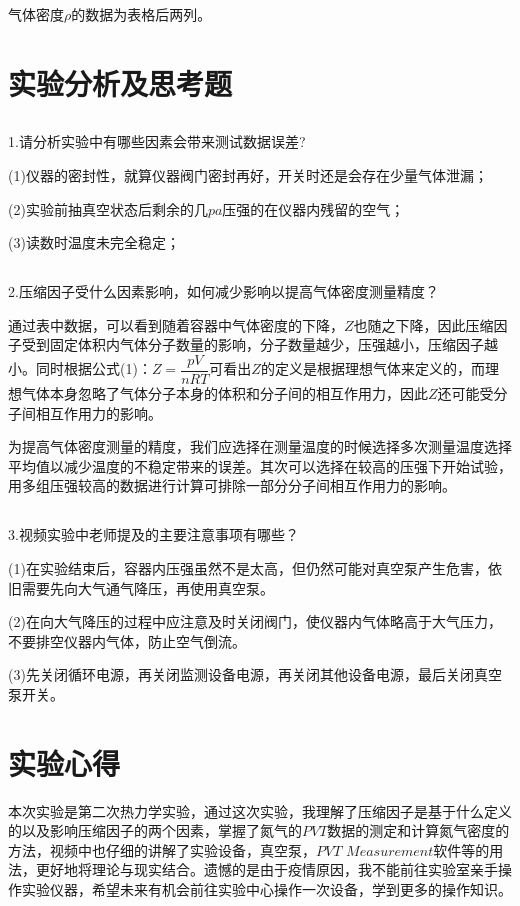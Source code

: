 \documentclass[UTF8,a4paper,10pt]{ctexart}
\begin{document}
    气体密度$\rho$的数据为表格后两列。
	\section{实验分析及思考题}
	\subsection{}
	1.请分析实验中有哪些因素会带来测试数据误差?
	
	(1)仪器的密封性，就算仪器阀门密封再好，开关时还是会存在少量气体泄漏；
	
	(2)实验前抽真空状态后剩余的几$pa$压强的在仪器内残留的空气；
	
	(3)读数时温度未完全稳定；
	\subsection{}
	2.压缩因子受什么因素影响，如何减少影响以提高气体密度测量精度？
	
	通过表中数据，可以看到随着容器中气体密度的下降，$Z$也随之下降，因此压缩因子受到固定体积内气体分子数量的影响，分子数量越少，压强越小，压缩因子越小。同时根据公式(1)：$Z=\dfrac{pV}{nRT}$可看出$Z$的定义是根据理想气体来定义的，而理想气体本身忽略了气体分子本身的体积和分子间的相互作用力，因此$Z$还可能受分子间相互作用力的影响。
	
	为提高气体密度测量的精度，我们应选择在测量温度的时候选择多次测量温度选择平均值以减少温度的不稳定带来的误差。其次可以选择在较高的压强下开始试验，用多组压强较高的数据进行计算可排除一部分分子间相互作用力的影响。
	\subsection{}
	3.视频实验中老师提及的主要注意事项有哪些？

    (1)在实验结束后，容器内压强虽然不是太高，但仍然可能对真空泵产生危害，依旧需要先向大气通气降压，再使用真空泵。

	(2)在向大气降压的过程中应注意及时关闭阀门，使仪器内气体略高于大气压力，不要排空仪器内气体，防止空气倒流。
	
	(3)先关闭循环电源，再关闭监测设备电源，再关闭其他设备电源，最后关闭真空泵开关。
	\section{实验心得}
	本次实验是第二次热力学实验，通过这次实验，我理解了压缩因子是基于什么定义的以及影响压缩因子的两个因素，掌握了氮气的$PVT$数据的测定和计算氮气密度的方法，视频中也仔细的讲解了实验设备，真空泵，$PVT$ $Measurement$软件等的用法，更好地将理论与现实结合。遗憾的是由于疫情原因，我不能前往实验室亲手操作实验仪器，希望未来有机会前往实验中心操作一次设备，学到更多的操作知识。
	
\end{document}

